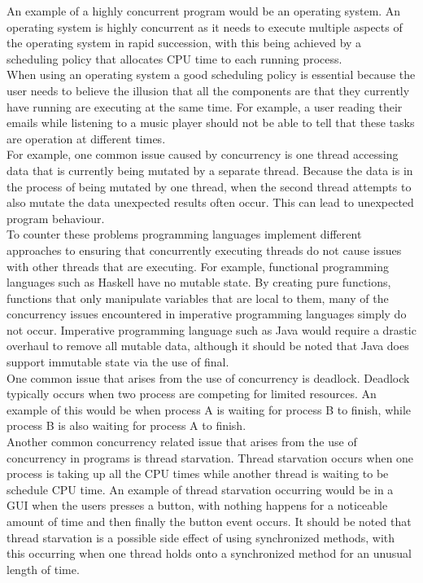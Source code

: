 \documentclass[10pt]{article}  %
\theoremstyle{definition}
\theoremstyle{remark}
\begin{document}
An example of a highly concurrent program would be an operating system. An operating system is highly concurrent as it needs to execute multiple aspects of the operating system in rapid succession, with this being achieved by a scheduling policy that allocates CPU time to each running process.\\

When using an operating system a good scheduling policy is essential because the user needs to believe the illusion that all the components are that they currently have running are executing at the same time. For example, a user reading their emails while listening to a music player should not be able to tell that these tasks are operation at different times.\\

For example, one common issue caused by concurrency is one thread accessing data that is currently being mutated by a separate thread. Because the data is in the process of being mutated by one thread, when the second thread attempts to also mutate the data unexpected results often occur. This can lead to unexpected program behaviour.\\

To counter these problems programming languages implement different approaches to ensuring that concurrently executing threads do not cause issues with other threads that are executing. For example, functional programming languages such as Haskell have no mutable state. By creating pure functions, functions that only manipulate variables that are local to them, many of the concurrency issues encountered in imperative programming languages simply do not occur. Imperative programming language such as Java would require a drastic overhaul to remove all mutable data, although it should be noted that Java does support immutable state via the use of final.\\

One common issue that arises from the use of concurrency is deadlock. Deadlock typically occurs when two process are competing for limited resources. An example of this would be when process A is waiting for process B to finish, while process B is also waiting for process A to finish.\\

Another common concurrency related issue that arises from the use of concurrency in programs is thread starvation. Thread starvation occurs when one process is taking up all the CPU times while another thread is waiting to be schedule CPU time. An example of thread starvation occurring would be in a GUI when the users presses a button, with nothing happens for a noticeable amount of time and then finally the button event occurs. It should be noted that thread starvation is a possible side effect of using synchronized methods, with this occurring when one thread holds onto a synchronized method for an unusual length of time. \\
\end{document}
